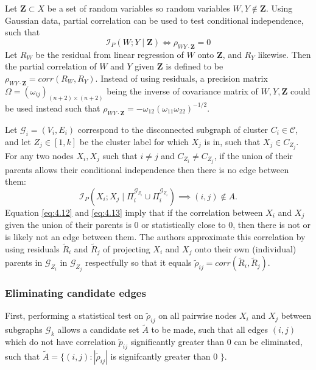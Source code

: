 \documentclass[twoside,11pt]{article}
\let\mc\mathcal
\let\mbf\mathbf
\begin{document}
Let $\mbf Z\subset{X}$ be a set of random variables so random variables $W,Y\not\in \mbf Z$. Using Gaussian data, partial correlation can be used to test conditional independence, such that
\begin{equation}
    \label{eq:4.12}
    \mc{I}_P(W;Y \mid \mbf Z) \iff \rho_{WY\cdot\mbf Z}=0
\end{equation}
Let $R_W$ be the residual from linear regression of $W$ onto $\mbf Z$, and $R_Y$ likewise. Then the partial correlation of $W$ and $Y$ given $\mbf Z$ is defined to be $\rho_{WY\cdot\mbf Z}=corr(R_W, R_Y)$. Instead of using residuals, a precision matrix $\Omega=(\omega_{ij})_{(n+2)\times(n+2)}$ being the inverse of covariance matrix of $W,Y,\mbf Z$ could be used instead such that $\rho_{WY\cdot\mbf Z}=-\omega_{12}(\omega_{11}\omega_{22})^{-1/2}$. 

Let $\mc{G}_i=(V_i,E_i)$ correspond to the disconnected subgraph of cluster $C_i\in\mc{C}$, and let $Z_j\in[1,k]$ be the cluster label for which $X_j$ is in, such that $X_j\in C_{Z_j}$. For any two nodes $X_i,X_j$ such that $i\neq j$ and $C_{Z_i}\neq C_{Z_j}$, if the union of their parents allows their conditional independence then there is no edge between them:
\begin{equation}
    \label{eq:4.13}
    \mc{I}_P(X_i;X_j \mid \Pi_i^{\mc{G}_{Z_i}}\cup\Pi_i^{\mc{G}_{Z_i}}) \implies (i,j)\not\in{A}.
\end{equation}
Equation \eqref{eq:4.12} and \eqref{eq:4.13} imply that if the correlation between $X_i$ and $X_j$ given the union of their parents is $0$ or statistically close to $0$, then there is not or is likely not an edge between them. The authors approximate this correlation by using residuals $\tilde{R}_i$ and $\tilde{R}_j$ of projecting $X_i$ and $X_j$ onto their own (individual) parents in $\mc{G}_{Z_i}$ in $\mc{G}_{Z_j}$ respectfully so that it equals $\tilde{\rho}_{ij}=corr(\tilde{R}_i,\tilde{R}_j)$.

\subsubsection{Eliminating candidate edges}

First, performing a statistical test on $\tilde{\rho}_{ij}$ on all pairwise nodes $X_i$ and $X_j$ between subgraphs $\mc{G}_k$ allows a candidate set $\tilde{A}$ to be made, such that all edges $(i,j)$ which do not have correlation $\tilde{p}_{ij}$ significantly greater than 0 can be eliminated, such that $\tilde{A}=\{(i,j) : |\tilde{\rho}_{ij}|$ is signifcantly greater than 0 $\}$.
\end{document}
